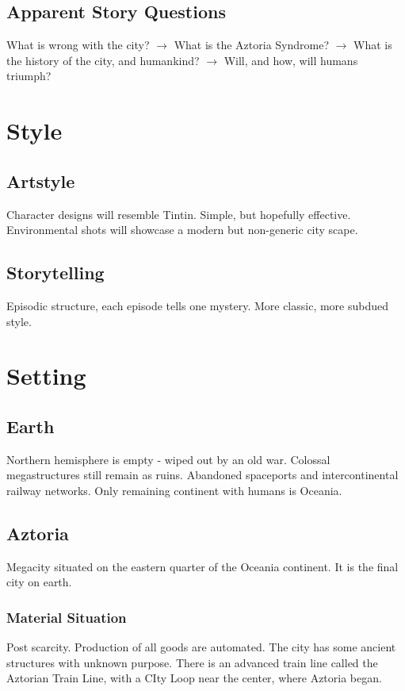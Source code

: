 \documentclass[11pt]{article}
\begin{document}
	\subsection{Apparent Story Questions}
	What is wrong with the city? $\rightarrow$ 
	What is the Aztoria Syndrome? $\rightarrow$  
	What is the history of the city, and humankind? $\rightarrow$ 
	Will, and how, will humans triumph?
\newpage






\section{Style}
	\subsection{Artstyle}
	Character designs will resemble Tintin. Simple, but hopefully effective.
	Environmental shots will showcase a modern but non-generic city scape.
	\subsection{Storytelling}
	Episodic structure, each episode tells one mystery. 
	More classic, more subdued style.
\newpage





\section{Setting}
	\subsection{Earth}
	Northern hemisphere is empty - wiped out by an old war.
	Colossal megastructures still remain as ruins.
	Abandoned spaceports and intercontinental railway networks.
	Only remaining continent with humans is Oceania.
	\subsection{Aztoria}
	Megacity situated on the eastern quarter of the Oceania continent. It is the final city on earth.
		\subsubsection{Material Situation}
		Post scarcity. Production of all goods are automated. 
		The city has some ancient structures with unknown purpose.
		There is an advanced train line called the Aztorian Train Line, with a CIty Loop near the center, where Aztoria began. 
\end{document}
